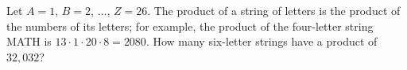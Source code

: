 Let $A=1$, $B=2$, $\ldots$, $Z=26$. The product of a string of letters is the product of the numbers of its letters; for example, the product of the four-letter string MATH is $13\cdot1\cdot20\cdot8=2080$. How many six-letter strings have a product of $32{,}032$?
